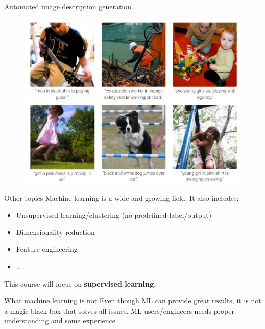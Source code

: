\documentclass{beamer}
\begin{document}
\begin{frame}{Automated image description generation}

\begin{figure}
\centering
\includegraphics[width=\textwidth]{images/generated_descriptions.jpg}
\end{figure}
\end{frame}

\begin{frame}{Other topics}
\vfill
Machine learning is a wide and growing field. It also includes:	
\pause 
\vfill
\begin{itemize}
	\item Unsupervised learning/clustering (no predefined label/output)
\pause 
\vfill
	\item Dimensionality reduction
\pause 
\vfill
	\item Feature engineering
\pause 
\vfill
	\item \ldots
\end{itemize}
\vfill
This course will focus on \textbf{supervised learning}.
\vfill
\end{frame}

\begin{frame}{What machine learning is not}
Even though ML can provide great results, it is not a magic black box that solves all issues.
\vfill
ML users/engineers needs proper understanding and some experience 
\end{frame}
\end{document}
